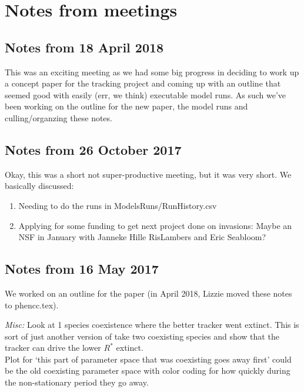 \documentclass[11pt,a4paper,oneside]{article}
\begin{document}
\section{Notes from meetings}
\subsection{Notes from 18 April 2018}

This was an exciting meeting as we had some big progress in deciding to work up a concept paper for the tracking project and coming up with an outline that seemed good with easily (err, we think) executable model runs. As such we've been working on the outline for the new paper, the model runs and culling/organzing these notes.

\subsection{Notes from 26 October 2017}
Okay, this was a short not super-productive meeting, but it was very short. We basically discussed:
\begin{enumerate} 
\item Needing to do the runs in ModelsRuns/RunHistory.csv
\item Applying for some funding to get next project done on invasions: Maybe an NSF in January with Janneke Hille RisLambers and Eric Seabloom?
\end{enumerate} 

\subsection{Notes from 16 May 2017}

We worked on an outline for the paper (in April 2018, Lizzie moved these notes to phencc.tex).

\emph{Misc:} 
Look at 1 species coexistence where the better tracker went extinct. This is sort of just another version of take two coexisting species and show that the tracker can drive the lower $R^*$ extinct.\\

Plot for `this part of parameter space that was coexisting goes away first' could be the old coexisting parameter space with color coding for how quickly during the non-stationary period they go away. 
\end{document}

